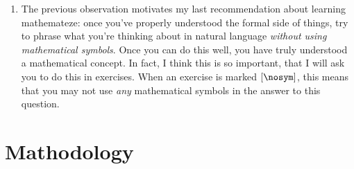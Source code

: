 \begin{enumerate}[{\thesection}.1]
	\item The previous observation motivates my last recommendation about learning mathemateze: once you've properly understood the formal side of things, try to phrase what you're thinking about in natural language \emph{without using mathematical symbols}. Once you can do this well, you have truly understood a mathematical concept. In fact, I think this is so important, that I will ask you to do this in exercises. When an exercise is marked $[\nosym]$, this means that you may not use \emph{any} mathematical symbols in the answer to this question.
		
	\end{enumerate}
		
	\section{Mathodology}


